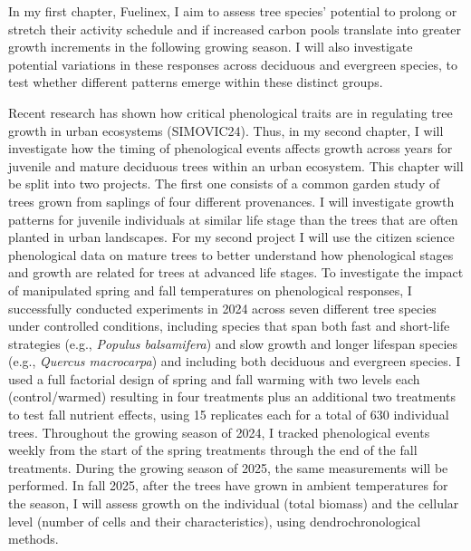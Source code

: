 \documentclass[11pt,letter]{article}
\begin{document}
In my first chapter, Fuelinex, I aim to assess tree species’ potential to prolong or stretch their activity schedule and if increased carbon pools translate into greater growth increments in the following growing season. I will also investigate potential variations in these responses across deciduous and evergreen species, to test whether different patterns emerge within these distinct groups.
\par 
Recent research has shown how critical phenological traits are in regulating tree growth in urban ecosystems (SIMOVIC24). Thus, in my second chapter, I will investigate how the timing of phenological events affects growth across years for juvenile and mature deciduous trees within an urban ecosystem. This chapter will be split into two projects. The first one consists of a common garden study of trees grown from saplings of four different provenances. I will investigate growth patterns for juvenile individuals at similar life stage than the trees that are often planted in urban landscapes. For my second project I will use the citizen science phenological data on mature trees to better understand how phenological stages and growth are related for trees at advanced life stages. 
To investigate the impact of manipulated spring and fall temperatures on phenological responses, I successfully conducted experiments in 2024 across seven different tree species under controlled conditions, including species that span both fast and short-life strategies (e.g., \textit{Populus balsamifera}) and slow growth and longer lifespan species (e.g., \textit{Quercus macrocarpa}) and including both deciduous and evergreen species. I used a full factorial design of spring and fall warming with two levels each (control/warmed) resulting in four treatments plus an additional two treatments to test fall nutrient effects, using 15 replicates each for a total of 630 individual trees. Throughout the growing season of 2024, I tracked phenological events weekly from the start of the spring treatments through the end of the fall treatments. During the growing season of 2025, the same measurements will be performed. In fall 2025, after the trees have grown in ambient temperatures for the season, I will assess growth on the individual (total biomass) and the cellular level (number of cells and their characteristics), using dendrochronological methods.
\par
\end{document}
